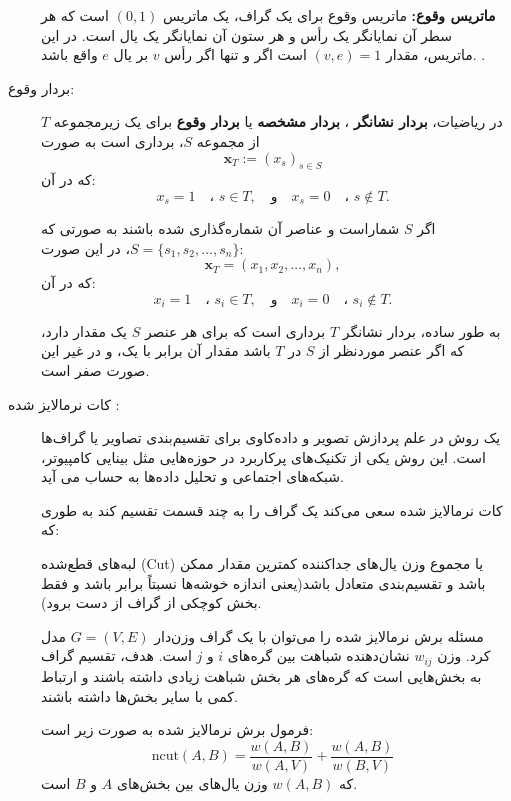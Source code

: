 \documentclass[a4paper,12pt,openany]{report}
\begin{document}
	\begin{description}
	\item[\textbullet] \textbf{ماتریس وقوع:}
		ماتریس وقوع برای یک گراف، یک ماتریس \( (0,1) \) است که هر سطر آن نمایانگر یک رأس و هر ستون آن نمایانگر یک یال است. در این ماتریس، مقدار \( (v, e) = 1 \) است اگر و تنها اگر رأس \( v \) بر یال \( e \) واقع باشد.
		.
		\item[\textbullet\ بردار وقوع:] 
		در ریاضیات، \textbf{بردار نشانگر} ، \textbf{بردار مشخصه}  یا \textbf{بردار وقوع}  برای یک زیرمجموعه \( T \) از مجموعه \( S \)، برداری است به صورت 
		\[
		\mathbf{x}_T := (x_s)_{s \in S}
		\]
		که در آن:
		\[
		x_s = 1 \quad \text{، } s \in T, \quad \text{و} \quad x_s = 0 \quad \text{، } s \notin T.
		\]
		
		اگر \( S \) شماراست و عناصر آن شماره‌گذاری شده باشند به صورتی که 
		\( S = \{s_1, s_2, \ldots, s_n\} \)، 
		در این صورت:
		\[
		\mathbf{x}_T = (x_1, x_2, \ldots, x_n),
		\]
		که در آن:
		\[
		x_i = 1 \quad \text{، } s_i \in T, \quad \text{و} \quad x_i = 0 \quad \text{، } s_i \notin T.
		\]
		
		به طور ساده، بردار نشانگر \( T \) برداری است که برای هر عنصر \( S \) یک مقدار دارد، که اگر عنصر موردنظر از \( S \) در \( T \) باشد مقدار آن برابر با یک، و در غیر این صورت صفر است.
		
		
		\vspace{0.5cm}
		
		\item[\textbullet\ کات نرمالایز شده :] 
		 یک روش در علم پردازش تصویر و داده‌کاوی برای تقسیم‌بندی  تصاویر یا گراف‌ها است. این روش یکی از تکنیک‌های پرکاربرد در حوزه‌هایی مثل بینایی کامپیوتر، شبکه‌های اجتماعی و تحلیل داده‌ها به حساب می آید.
		
		
		کات نرمالایز شده سعی می‌کند یک گراف را به چند قسمت تقسیم کند به طوری که:
		
		لبه‌های قطع‌شده (Cut) یا مجموع وزن یال‌های جداکننده کمترین مقدار ممکن باشد و
		تقسیم‌بندی متعادل باشد(یعنی اندازه خوشه‌ها نسبتاً برابر باشد و فقط بخش کوچکی از گراف از دست برود).
		
		مسئله برش نرمالایز شده را می‌توان با یک گراف وزن‌دار \( G = (V, E) \) مدل کرد. وزن \( w_{ij} \) نشان‌دهنده شباهت بین گره‌های \( i \) و \( j \) است. هدف، تقسیم گراف به بخش‌هایی است که گره‌های هر بخش شباهت زیادی داشته باشند و ارتباط کمی با سایر بخش‌ها داشته باشند.
		
		
		
		فرمول برش نرمالایز شده به صورت زیر است:
		\[
		\text{ncut}(A, B) = \frac{w(A, B)}{w(A, V)} + \frac{w(A, B)}{w(B, V)}
		\]
		که \( w(A, B) \) وزن یال‌های بین بخش‌های \( A \) و \( B \) است. 
		

\end{description}
\end{document}
